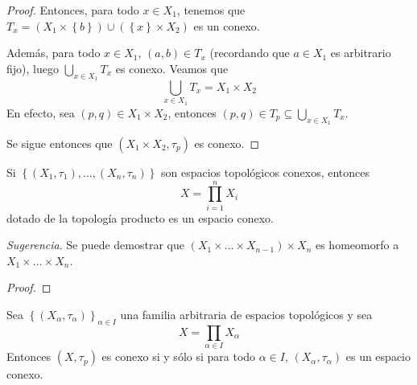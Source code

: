 \documentclass[12pt]{report}
\theoremstyle{largebreak}
\begin{document}
    \begin{proof}
        

        Entonces, para todo $x\in X_1$, tenemos que $T_x=(X_1\times\left\{b\right\})\cup(\left\{x\right\}\times X_2)$ es un conexo.

        Además, para todo $x\in X_1$, $(a,b)\in T_x$ (recordando que $a\in X_1$ es arbitrario fijo), luego $\bigcup_{ x\in X_1}T_x$ es conexo. Veamos que
        \begin{equation*}
            \bigcup_{ x\in X_1}T_x=X_1\times X_2
        \end{equation*}
        En efecto, sea $(p,q)\in X_1\times X_2$, entonces $(p,q)\in T_p\subseteq\bigcup_{x\in X_1}T_x$.
    
        Se sigue entonces que $(X_1\times X_2,\tau_p)$ es conexo.
    \end{proof}

    \begin{excer}
        Si $\left\{(X_1,\tau_1),...,(X_n,\tau_n)\right\}$ son espacios topológicos conexos, entonces
        \begin{equation*}
            X=\prod_{ i=1}^n X_i
        \end{equation*}
        dotado de la topología producto es un espacio conexo.
        
        \textit{Sugerencia}. Se puede demostrar que $(X_1\times...\times X_{ n-1})\times X_n$ es homeomorfo a $X_1\times...\times X_n$.
    \end{excer}

    \begin{proof}
        
    \end{proof}

    \begin{propo}
        Sea $\left\{(X_\alpha,\tau_\alpha)\right\}_{\alpha\in I}$ una familia arbitraria de espacios topológicos y sea
        \begin{equation*}
            X=\prod_{\alpha\in I}X_\alpha
        \end{equation*}
        Entonces $(X,\tau_p)$ es conexo si y sólo si para todo $\alpha\in I$, $(X_\alpha,\tau_\alpha)$ es un espacio conexo.
    \end{propo}
\end{document}

